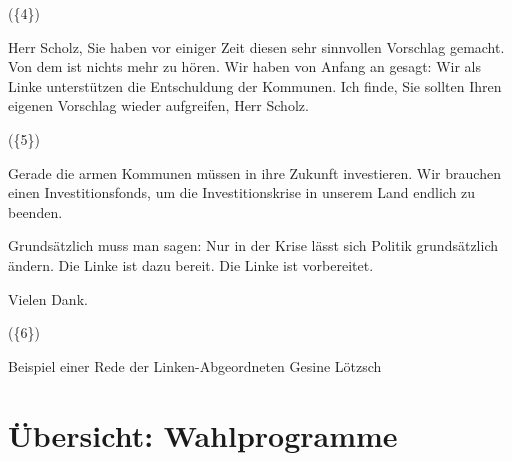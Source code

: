 \begin{example}[H]
    (\{4\})

    Herr Scholz, Sie haben vor einiger Zeit diesen sehr sinnvollen Vorschlag gemacht. Von dem ist nichts mehr zu hören. Wir haben von Anfang an gesagt: Wir als Linke unterstützen die Entschuldung der Kommunen. Ich finde, Sie sollten Ihren eigenen Vorschlag wieder aufgreifen, Herr Scholz.

    (\{5\})

    Gerade die armen Kommunen müssen in ihre Zukunft investieren. Wir brauchen einen Investitionsfonds, um die Investitionskrise in unserem Land endlich zu beenden.

    Grundsätzlich muss man sagen: Nur in der Krise lässt sich Politik grundsätzlich ändern. Die Linke ist dazu bereit. Die Linke ist vorbereitet.

    Vielen Dank.

    (\{6\})
    \caption{Beispiel einer Rede der Linken-Abgeordneten Gesine Lötzsch \autocite{richter_open_2021}} \label{list:exampleSpeechSpd}
\end{example}

\clearpage

\section{Übersicht: Wahlprogramme}


